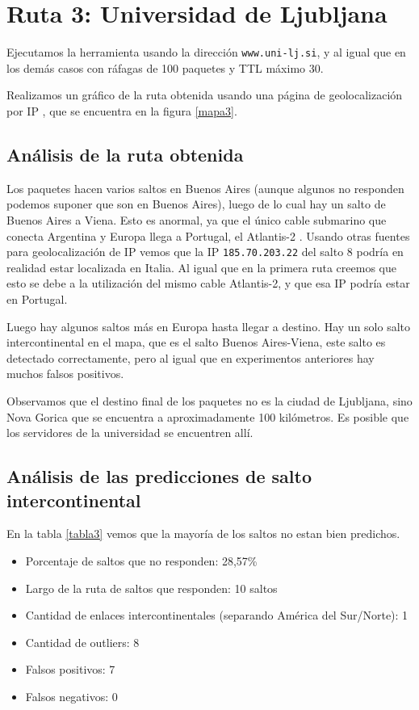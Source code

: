 \section{Ruta 3: Universidad de Ljubljana}

Ejecutamos la herramienta usando la dirección \texttt{www.uni-lj.si}, y al igual que en los demás casos con ráfagas de 100 paquetes y TTL máximo 30.

Realizamos un gráfico de la ruta obtenida usando una página de geolocalización por IP \cite{ip2location}, que se encuentra en la figura \ref{mapa3}.

\subsection{Análisis de la ruta obtenida}

Los paquetes hacen varios saltos en Buenos Aires (aunque algunos no responden podemos suponer que son en Buenos Aires), luego de lo cual hay un salto de Buenos Aires a Viena. Esto es anormal, ya que el único cable submarino que conecta Argentina y Europa llega a Portugal, el Atlantis-2 \cite{atlantis2}. Usando otras fuentes para geolocalización de IP vemos que la IP \texttt{185.70.203.22} del salto 8 podría en realidad estar localizada en Italia. Al igual que en la primera ruta creemos que esto se debe a la utilización del mismo cable Atlantis-2, y que esa IP podría estar en Portugal.

Luego hay algunos saltos más en Europa hasta llegar a destino. Hay un solo salto intercontinental en el mapa, que es el salto Buenos Aires-Viena, este salto es detectado correctamente, pero al igual que en experimentos anteriores hay muchos falsos positivos.

Observamos que el destino final de los paquetes no es la ciudad de Ljubljana, sino Nova Gorica que se encuentra a aproximadamente 100 kilómetros. Es posible que los servidores de la universidad se encuentren allí.

\subsection{Análisis de las predicciones de salto intercontinental}

En la tabla \ref{tabla3} vemos que la mayoría de los saltos no estan bien predichos.

\begin{itemize}
	\item Porcentaje de saltos que no responden: 28,57\%
	\item Largo de la ruta de saltos que responden: 10 saltos 
	\item Cantidad de enlaces intercontinentales (separando América del Sur/Norte): 1
	\item Cantidad de outliers: 8
	\item Falsos positivos: 7
	\item Falsos negativos: 0
\end{itemize}

